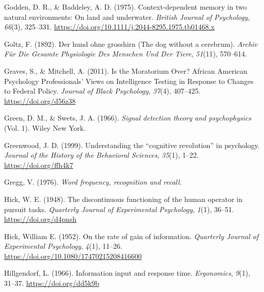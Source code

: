 \documentclass[
  oneside,
  12pt]{crumpbook}
\newlength{\cslhangindent}
\newlength{\cslentryspacingunit} %
\newenvironment{CSLReferences}[2] %
 {%
  \setlength{\parindent}{0pt}
  \ifodd #1
  \let\oldpar\par
  \def\par{\hangindent=\cslhangindent\oldpar}
  \fi
  \setlength{\parskip}{#2\cslentryspacingunit}
 }%
 {}
\begin{document}
\begin{CSLReferences}{1}{0}
\leavevmode{}%
Godden, D. R., \& Baddeley, A. D. (1975). Context-dependent memory in two natural environments: {On} land and underwater. \emph{British Journal of Psychology}, \emph{66}(3), 325--331. \url{https://doi.org/10.1111/j.2044-8295.1975.tb01468.x}

\leavevmode{}%
Goltz, F. (1892). Der hund ohne grosshirn ({The} dog without a cerebrum). \emph{Archiv Für Die Gesamte Physiologie Des Menschen Und Der Tiere}, \emph{51}(11), 570--614.

\leavevmode{}%
Graves, S., \& Mitchell, A. (2011). Is the {Moratorium Over}? {African American Psychology Professionals}' {Views} on {Intelligence Testing} in {Response} to {Changes} to {Federal Policy}. \emph{Journal of Black Psychology}, \emph{37}(4), 407--425. \url{https://doi.org/d56z38}

\leavevmode{}%
Green, D. M., \& Swets, J. A. (1966). \emph{Signal detection theory and psychophysics} (Vol. 1). {Wiley New York}.

\leavevmode{}%
Greenwood, J. D. (1999). Understanding the {``cognitive revolution''} in psychology. \emph{Journal of the History of the Behavioral Sciences}, \emph{35}(1), 1--22. \url{https://doi.org/ffh4k7}

\leavevmode{}%
Gregg, V. (1976). \emph{Word frequency, recognition and recall.}

\leavevmode{}%
Hick, W. E. (1948). The discontinuous functioning of the human operator in pursuit tasks. \emph{Quarterly Journal of Experimental Psychology}, \emph{1}(1), 36--51. \url{https://doi.org/d4pnsh}

\leavevmode{}%
Hick, William E. (1952). On the rate of gain of information. \emph{Quarterly Journal of Experimental Psychology}, \emph{4}(1), 11--26. \url{https://doi.org/10.1080/17470215208416600}

\leavevmode{}%
Hillgendorf, L. (1966). Information input and response time. \emph{Ergonomics}, \emph{9}(1), 31--37. \url{https://doi.org/dd5k9b}


\end{CSLReferences}
\end{document}
